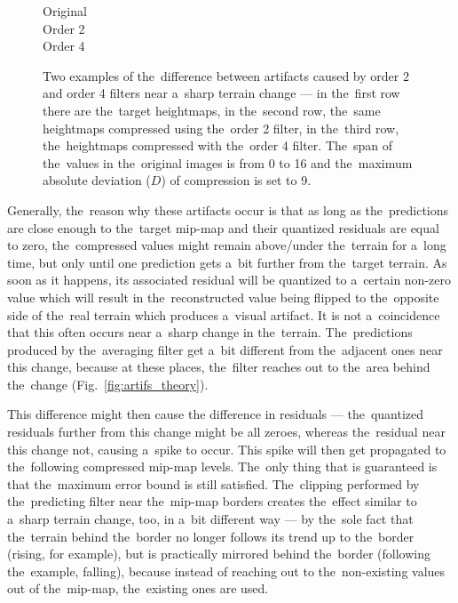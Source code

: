 \begin{figure}
	\begin{center}
	Original 
	 \\ 
	Order 2 
	 \\ 
	Order 4 
	 \\ 
	\end{center}
	\caption{Two examples of the~difference between artifacts caused by order 2 and order 4 filters near a~sharp terrain change --- in the~first row there are the~target heightmaps, in the~second row, the~same heightmaps compressed using the~order 2 filter, in the~third row, the~heightmaps compressed with the~order 4 filter. The~span of the~values in the~original images is from 0 to 16 and the~maximum absolute deviation ($D$) of compression is set to 9.}
	\label{fig:artifs_sharp_change}
\end{figure}

Generally, the~reason why these artifacts occur is that as long as the~predictions are close enough to the~target mip-map and their quantized residuals are equal to zero, the~compressed values might remain above/under the~terrain for a~long time, but only until one prediction gets a~bit further from the~target terrain. As soon as it happens, its associated residual will be quantized to a~certain non-zero value which will result in the~reconstructed value being flipped to the~opposite side of the~real terrain which produces a~visual artifact. It is not a~coincidence that this often occurs near a~sharp change in the~terrain. The~predictions produced by the~averaging filter get a~bit different from the~adjacent ones near this change, because at these places, the~filter reaches out to the~area behind the~change (Fig.~\ref{fig:artifs_theory}). 

This difference might then cause the difference in residuals --- the~quantized residuals further from this change might be all zeroes, whereas the~residual near this change not, causing a~spike to occur. This spike will then get propagated to the~following compressed mip-map levels. The~only thing that is guaranteed is that the~maximum error bound is still satisfied. The~clipping performed by the~predicting filter near the~mip-map borders creates the~effect similar to a~sharp terrain change, too, in a~bit different way --- by the~sole fact that the~terrain behind the~border no longer follows its trend up to the~border (rising, for example), but is practically mirrored behind the~border (following the~example, falling), because instead of reaching out to the~non-existing values out of the~mip-map, the~existing ones are used.

